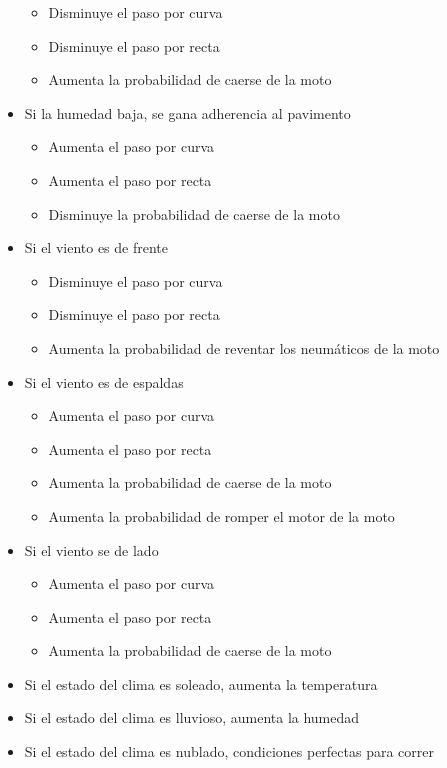 \documentclass[12pt, letterpaper,spanish]{article}
\theoremstyle{definition}
\theoremstyle{remark}
\begin{document}
\begin{itemize}
\begin{itemize}
			\item Disminuye el paso por curva
			\item Disminuye el paso por recta
			\item Aumenta la probabilidad de caerse de la moto
		\end{itemize}
		\item Si la humedad baja, se gana adherencia al pavimento
		\begin{itemize}
			\item Aumenta el paso por curva
			\item Aumenta el paso por recta
			\item Disminuye la probabilidad de caerse de la moto
		\end{itemize}
		
		\item Si el viento es de frente
		\begin{itemize}
			\item Disminuye el paso por curva
			\item Disminuye el paso por recta
			\item Aumenta la probabilidad de reventar los neumáticos de la moto
		\end{itemize}
		\item Si el viento es de espaldas
		\begin{itemize}
			\item Aumenta el paso por curva
			\item Aumenta el paso por recta
			\item Aumenta la probabilidad de caerse de la moto
			\item Aumenta la probabilidad de romper el motor de la moto
		\end{itemize}
		\item Si el viento se de lado
		\begin{itemize}
			\item Aumenta el paso por curva
			\item Aumenta el paso por recta
			\item Aumenta la probabilidad de caerse de la moto
		\end{itemize}
		
		\item Si el estado del clima es soleado, aumenta la temperatura
		\item Si el estado del clima es lluvioso, aumenta la humedad
		\item Si el estado del clima es nublado, condiciones perfectas para correr
		

\end{itemize}
\end{document}
